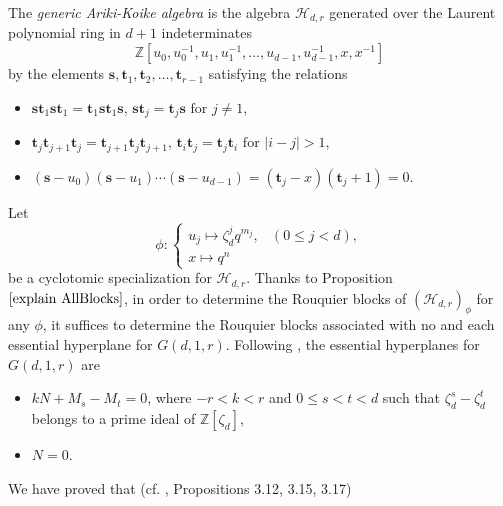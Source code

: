 \documentclass[10pt,a4paper,titlepage]{article}
\begin{document}
The \emph{generic Ariki-Koike algebra} is the algebra $\mathcal{H}_{d,r}$ generated over the Laurent polynomial ring in $d+1$ indeterminates  
$$\mathbb{Z}[u_0,u_0^{-1},u_1,u_1^{-1},\ldots,u_{d-1},u_{d-1}^{-1},x,x^{-1}]$$
by the elements $\mathrm{\textbf{s}},\mathrm{\textbf{t}}_1,\mathrm{\textbf{t}}_2,\ldots,\mathrm{\textbf{t}}_{r-1}$ satisfying the relations
\begin{itemize}
\item $\mathrm{\textbf{s}}\mathrm{\textbf{t}}_1\mathrm{\textbf{s}}\mathrm{\textbf{t}}_1=\mathrm{\textbf{t}}_1\mathrm{\textbf{s}}\mathrm{\textbf{t}}_1\mathrm{\textbf{s}}$, $\mathrm{\textbf{s}}\mathrm{\textbf{t}}_j=\mathrm{\textbf{t}}_j\mathrm{\textbf{s}} \textrm{ for } j\neq 1$,
\item $\mathrm{\textbf{t}}_j\mathrm{\textbf{t}}_{j+1}\mathrm{\textbf{t}}_j=\mathrm{\textbf{t}}_{j+1}\mathrm{\textbf{t}}_j\mathrm{\textbf{t}}_{j+1}$,  $ \mathrm{\textbf{t}}_i\mathrm{\textbf{t}}_j=\mathrm{\textbf{t}}_j\mathrm{\textbf{t}}_i \textrm{ for } |i-j|>1$,
\item $(\mathrm{\textbf{s}}-u_0)(\mathrm{\textbf{s}}-u_1)\cdots(\mathrm{\textbf{s}}-u_{d-1})=(\mathrm{\textbf{t}}_j-x)(\mathrm{\textbf{t}}_j+1)=0$.
\end{itemize}


Let $$\phi : \left\{ 
\begin{array}{ll} 
u_j \mapsto \zeta_d^j q^{m_j}, &(0 \leq j <d),\\ 
x \mapsto q^n
\end{array} \right. 
$$ be a cyclotomic specialization for $\mathcal{H}_{d,r}$.
Thanks to Proposition $\ref{explain AllBlocks}$, in order to determine the Rouquier blocks of $(\mathcal{H}_{d,r})_\phi$ for any $\phi$, it suffices to determine the Rouquier blocks associated with no and each essential hyperplane for $G(d,1,r)$. Following \cite{Chlou2}, the essential hyperplanes for $G(d,1,r)$ are 
\begin{itemize}
\item $kN+M_s-M_t=0$, where $-r<k<r$  and $0 \leq s<t<d$ such that $\zeta_d^s-\zeta_d^t$ belongs to a prime ideal of 
 $\mathbb{Z}[\zeta_{d}]$,
\item $N=0$.
\end{itemize} 

We have proved that (cf. \cite{Chlou2}, Propositions 3.12, 3.15, 3.17)
\end{document}
